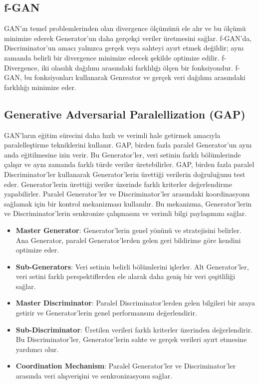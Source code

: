 \subsection{f-GAN}

GAN'ın temel problemlerinden olan divergence ölçümünü ele alır ve bu ölçümü minimize ederek Generator'un daha gerçekçi veriler üretmesini sağlar. f-GAN'da, Discriminator'un amacı yalnızca gerçek veya sahteyi ayırt etmek değildir; aynı zamanda belirli bir divergence minimize edecek şekilde optimize edilir. f-Divergence, iki olasılık dağılımı arasındaki farklılığı ölçen bir fonksiyondur. f-GAN, bu fonksiyonları kullanarak Genreator ve gerçek veri dağılımı arasındaki farklılığı minimize eder. 

\subsection{Generative Adversarial Paralellization (GAP)}

GAN'ların eğitim sürecini daha hızlı ve verimli hale getirmek amacıyla paralelleştirme tekniklerini kullanır. GAP, birden fazla paralel Generator'un aynı anda eğitilmesine izin verir. Bu Generator'ler, veri setinin farklı bölümlerinde çalışır ve aynı zamanda farklı türde veriler üretebilirler. GAP, birden fazla paralel Discriminator'ler kullanarak Generator'lerin ürettiği verilerin doğruluğunu test eder. Generator'lerin ürettiği veriler üzerinde farklı kriterler değerlendirme yapabilirler. Paralel Generator'ler ve Discriminator'ler arasındaki koordinasyonu sağlamak için bir kontrol mekanizması kullanılır. Bu mekanizma, Generator'lerin ve Discriminator'lerin senkronize çalışmasını ve verimli bilgi paylaşımını sağlar.

\begin{itemize}
    \item \textbf{Master Generator}: Generator'lerin genel yönünü ve stratejisini belirler. Ana Generator, paralel Generator'lerden gelen geri bildirime göre kendini optimize eder.
    \item \textbf{Sub-Generators}: Veri setinin belirli bölümlerini işlerler. Alt Generator'ler, veri setini farklı perspektiflerden ele alarak daha geniş bir veri çeşitliliği sağlar.
    \item \textbf{Master Discriminator}: Paralel Discriminator'lerden gelen bilgileri bir araya getirir ve Generator'lerin genel performansını değerlendirir.
    \item \textbf{Sub-Discriminator}: Üretilen verileri farklı kriterler üzerinden değerlendirir. Bu Discriminator'ler, Generator'lerin sahte ve gerçek verileri ayırt etmesine yardımcı olur.
    \item \textbf{Coordination Mechanism}: Paralel Generator'ler ve Discriminator'ler arasında veri alışverişini ve senkronizasyonu sağlar.
\end{itemize}


